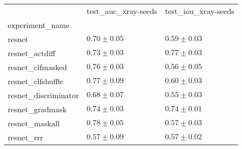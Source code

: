 \begin{tabular}{lll}
\toprule
{} & test_auc_xray-seeds & test_iou_xray-seeds \\
experiment_name      &                     &                     \\
\midrule
resnet               &       $0.70\pm0.05$ &       $0.59\pm0.03$ \\
resnet_actdiff       &       $0.73\pm0.03$ &       $0.77\pm0.03$ \\
resnet_clfmasked     &       $0.76\pm0.03$ &       $0.56\pm0.05$ \\
resnet_clfshuffle    &       $0.77\pm0.09$ &       $0.60\pm0.03$ \\
resnet_discriminator &       $0.68\pm0.07$ &       $0.55\pm0.03$ \\
resnet_gradmask      &       $0.74\pm0.03$ &       $0.74\pm0.01$ \\
resnet_maskall       &       $0.78\pm0.05$ &       $0.57\pm0.03$ \\
resnet_rrr           &       $0.57\pm0.09$ &       $0.57\pm0.02$ \\
\bottomrule
\end{tabular}

